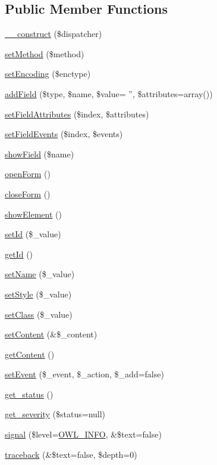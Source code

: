 \subsection*{Public Member Functions}
\begin{DoxyCompactItemize}
\item 
\hyperlink{classForm_ad0247731b52213ae543452da25da005b}{\_\-\_\-construct} (\$dispatcher)
\item 
\hyperlink{classForm_a2dc6461afb09effeefe444847ad9b562}{setMethod} (\$method)
\item 
\hyperlink{classForm_a2b1f9bb23c4da0558002b62f60b55078}{setEncoding} (\$enctype)
\item 
\hyperlink{classForm_a880197a858a70581146d6f0d275eff02}{addField} (\$type, \$name, \$value= '', \$attributes=array())
\item 
\hyperlink{classForm_a83cd5bed7649ecfe202dd97a8129f6f8}{setFieldAttributes} (\$index, \$attributes)
\item 
\hyperlink{classForm_a011360ce04a237f5609446f3134ec32c}{setFieldEvents} (\$index, \$events)
\item 
\hyperlink{classForm_a29e01263557e33fab02ee5c3aaa0b3f5}{showField} (\$name)
\item 
\hyperlink{classForm_a94902cc2869e1608247d9204036af7d1}{openForm} ()
\item 
\hyperlink{classForm_a9bb2df9ed7b866b0dc4b29b3874c2a1a}{closeForm} ()
\item 
\hyperlink{classForm_aeac5855c8b2406c34090a621d59df664}{showElement} ()
\item 
\hyperlink{classBaseElement_a0c1ce3d1684ecb78960cf7a97278494e}{setId} (\$\_\-value)
\item 
\hyperlink{classBaseElement_a4a7aa583ee21af392908d7fd42fde790}{getId} ()
\item 
\hyperlink{classBaseElement_a39bafb3609d10048920c20242c2a04c5}{setName} (\$\_\-value)
\item 
\hyperlink{classBaseElement_a6b2b9ff69f6e92db82f91d9c55cda697}{setStyle} (\$\_\-value)
\item 
\hyperlink{classBaseElement_af6597b30fa9798878f6290271043dfa2}{setClass} (\$\_\-value)
\item 
\hyperlink{classBaseElement_a164a9c6e4ee68afa0ad343942ba54d28}{setContent} (\&\$\_\-content)
\item 
\hyperlink{classBaseElement_af8c86b93bcdcfbc415bf96c622dc5516}{getContent} ()
\item 
\hyperlink{classBaseElement_ad5789f45f16aaa144716ee8558069c31}{setEvent} (\$\_\-event, \$\_\-action, \$\_\-add=false)
\item 
\hyperlink{class__OWL_a99ec771fa2c5c279f80152cc09e489a8}{get\_\-status} ()
\item 
\hyperlink{class__OWL_adf9509ef96858be7bdd9414c5ef129aa}{get\_\-severity} (\$status=null)
\item 
\hyperlink{class__OWL_a51ba4a16409acf2a2f61f286939091a5}{signal} (\$level=\hyperlink{owl_8severitycodes_8php_a139328861128689f2f4def6a399d9057}{OWL\_\-INFO}, \&\$text=false)
\item 
\hyperlink{class__OWL_aa29547995d6741b7d2b90c1d4ea99a13}{traceback} (\&\$text=false, \$depth=0)
\end{DoxyCompactItemize}
